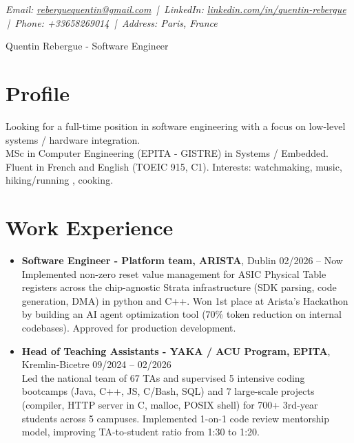 \documentclass[9pt,a4paper]{article}
\newcommand{\namefont}{\fontsize{18}{22}\selectfont}
\newcommand{\tinyscript}{\fontsize{8}{8}\selectfont}
\begin{document}
\renewcommand\normalsize{\fontsize{10.5}{15}\selectfont}
\normalsize

\begin{center}
  {\tinyscript\itshape
  Email: \href{mailto:reberguequentin@gmail.com}{reberguequentin@gmail.com} \,|\,
  LinkedIn: \href{https://linkedin.com/in/quentin-rebergue}{linkedin.com/in/quentin-rebergue} \,|\,
  Phone: +33658269014 \,|\,
  Address: Paris, France}
\end{center}

\begin{center}
  {\namefont Quentin Rebergue - Software Engineer}
\end{center}

\section*{Profile}
\begin{tcolorbox}[mybox2]
Looking for a full-time position in software engineering with a focus on low-level systems / hardware integration.\\[0.3em]
MSc in Computer Engineering (EPITA - GISTRE) in Systems / Embedded.\\[0.3em]
Fluent in French and English (TOEIC 915, C1). Interests: watchmaking, music, hiking/running , cooking.
\end{tcolorbox}

\section*{Work Experience}
\begin{tcolorbox}[mybox]
\begin{itemize}
\item\textbf{Software Engineer - Platform team, ARISTA}, Dublin \hfill {\small02/2026 – Now}\\[0.5em]
\textcolor{gray!40!black}{Implemented non-zero reset value management for ASIC Physical Table registers across the chip-agnostic Strata infrastructure (SDK parsing, code generation, DMA) in python and C++.
Won 1st place at Arista's Hackathon by building an AI agent optimization tool (70\% token reduction on internal codebases). Approved for production development.}

\item\textbf{Head of Teaching Assistants - YAKA / ACU Program, EPITA}, Kremlin-Bicetre \hfill {\small09/2024 – 02/2026}\\[0.5em]
\textcolor{gray!40!black}{Led the national team of 67 TAs and supervised 5 intensive coding bootcamps (Java, C++, JS, C/Bash, SQL) and 7 large-scale projects (compiler, HTTP server in C, malloc, POSIX shell) for 700+ 3rd-year students across 5 campuses. Implemented 1-on-1 code review mentorship model, improving TA-to-student ratio from 1:30 to 1:20.}
\end{itemize}
\end{tcolorbox}
\end{document}
